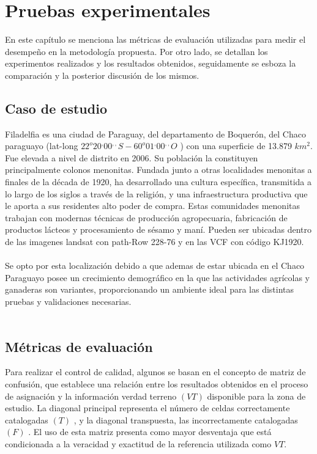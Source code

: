 \newpage{\ } 
\thispagestyle{empty} 

\chapter{Pruebas experimentales}
En este capítulo se menciona las m\'etricas de evaluaci\'on utilizadas para medir el desempe\~{n}o en la metodolog\'ia propuesta. Por otro lado, se detallan los experimentos realizados y los resultados obtenidos, seguidamente se esboza la comparaci\'on y la posterior discusi\'on de los mismos.

\section{Caso de estudio}
Filadelfia es una ciudad de Paraguay, del departamento de Boquer\'on, del Chaco paraguayo (lat-long $22^{o}20^{,}00^{,,} S - 60^{o}01^{,} 00^{,,} O$ ) con una superficie de 13.879 $ km^{2} $. Fue elevada a nivel de distrito en 2006. Su poblaci\'on la constituyen principalmente colonos menonitas. Fundada junto a otras localidades menonitas a finales de la d\'ecada de 1920, ha desarrollado una cultura espec\'ifica, transmitida a lo largo de los siglos a trav\'es de la religi\'on, y una infraestructura productiva que le aporta a sus residentes alto poder de compra. Estas comunidades menonitas trabajan con modernas t\'ecnicas de producci\'on agropecuaria, fabricaci\'on de productos l\'acteos y procesamiento de s\'esamo y man\'i. Pueden ser ubicadas dentro de las imagenes landsat con path-Row 228-76 y en las VCF con c\'odigo KJ1920.\\~\\
Se opto por esta localizaci\'on debido a que ademas de estar ubicada en el Chaco Paraguayo posee un crecimiento demogr\'afico en la que las actividades agr\'icolas y ganaderas son variantes, proporcionando un ambiente ideal para las distintas pruebas y validaciones necesarias.\\~\\

\section{Métricas de evaluación}
Para realizar el control de calidad, algunos se basan en el concepto de matriz de confusi\'on, que establece una relaci\'on entre los resultados obtenidos en el proceso de asignaci\'on y la informaci\'on verdad terreno $ (VT) $ disponible para la zona de estudio. La diagonal principal representa el n\'umero de celdas correctamente catalogadas $ (T) $ , y la diagonal transpuesta, las incorrectamente catalogadas $ (F) $ . El uso de esta matriz presenta como mayor desventaja que est\'a condicionada a la veracidad y exactitud de la referencia utilizada como $ VT $.

